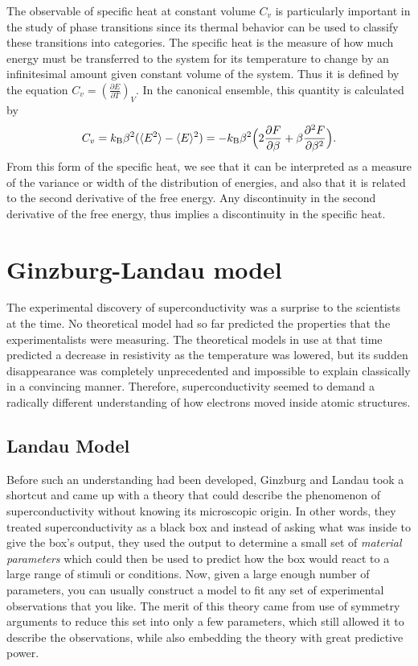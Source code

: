 The observable of specific heat at constant volume $C_v$ is particularly important in the study of phase transitions
since its thermal
behavior can be used to classify these transitions into categories. The specific heat is the measure
of how much energy must be transferred to the system for its temperature to change by an infinitesimal amount
given constant volume of the system. Thus it is defined by the equation $C_v = (\frac{\partial E}{\partial T})_V$.
In the canonical ensemble, this quantity is calculated by
\begin{equation}
    \label{eq:statMech:specificHeat}
    C_v = k_\text{B}\beta^2(\langle E^2 \rangle-\langle E \rangle^2) = -k_\text{B}\beta^2\Big(2\frac{\partial F}{\partial\beta}+\beta\frac{\partial^2 F}{\partial\beta^2}\Big).
\end{equation}
From this form of the specific heat, we see that it can be interpreted as a measure of the variance or width of the
distribution of energies, and also that it is related to the second derivative of the free energy. Any discontinuity
in the second derivative of the free energy, thus implies a discontinuity in the specific heat.

\section{Ginzburg-Landau model}

The experimental discovery of superconductivity was a surprise to the scientists at the time. No theoretical model
had so far predicted the properties that the experimentalists were measuring. The theoretical models in use at that
time predicted a decrease in resistivity as the temperature was lowered, but its sudden disappearance was completely
unprecedented and impossible to explain classically in a convincing manner. Therefore, superconductivity seemed to demand
a radically different understanding of how electrons moved inside atomic structures.

\subsection{Landau Model}

Before such an understanding had been developed, Ginzburg and Landau took a shortcut and came up with a theory
that could describe the phenomenon of superconductivity without knowing its microscopic origin. In other words,
they treated superconductivity as a black box and instead of asking what was inside to give the box's output,
they used the output to determine a small set of \emph{material parameters} which could then be used to predict
how the box would react to a large range of stimuli or conditions. Now, given a large enough number of parameters,
you can usually construct a model to fit any set of experimental observations that you like. The merit of this theory
came from use of symmetry arguments to reduce this set into only a few parameters, which still allowed it to describe the
observations, while also embedding the theory with great predictive power.

